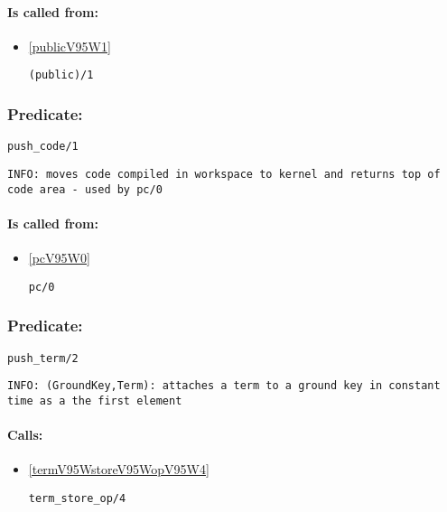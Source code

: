 \paragraph{Is called from:} 
\begin{itemize}
\item \ref{publicV95W1} 
\begin{verbatim}
(public)/1
\end{verbatim}

\end{itemize}

\subsubsection{Predicate:} \label{pushV95WcodeV95W1}

\begin{verbatim}
push_code/1
\end{verbatim}

{\small \begin{verbatim}
INFO: moves code compiled in workspace to kernel and returns top of code area - used by pc/0

\end{verbatim}}
\paragraph{Is called from:} 
\begin{itemize}
\item \ref{pcV95W0} 
\begin{verbatim}
pc/0
\end{verbatim}

\end{itemize}

\subsubsection{Predicate:} \label{pushV95WtermV95W2}

\begin{verbatim}
push_term/2
\end{verbatim}

{\small \begin{verbatim}
INFO: (GroundKey,Term): attaches a term to a ground key in constant time as a the first element

\end{verbatim}}
\paragraph{Calls:} 
\begin{itemize}
\item \ref{termV95WstoreV95WopV95W4} 
\begin{verbatim}
term_store_op/4
\end{verbatim}

\end{itemize}


